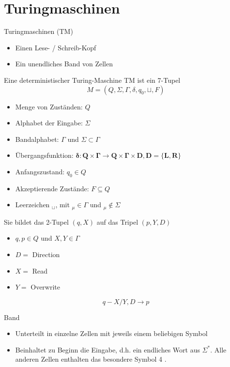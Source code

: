 \graphicspath{{images/}}

\section*{Turingmaschinen}

\begin{theorem}{Turingmaschinen (TM)}
    \begin{itemize}
        \item Einen Lese- / Schreib-Kopf
        \item Ein unendliches Band von Zellen
      \end{itemize}
      
      Eine deterministischer Turing-Maschine TM ist ein 7-Tupel
      $$
      M=\left(Q, \Sigma, \Gamma, \delta, q_{0}, \sqcup , F\right)
      $$
      \begin{itemize}
        \item Menge von Zuständen: $Q$
        \item Alphabet der Eingabe: $\Sigma$
        \item Bandalphabet: $\Gamma$ und $\Sigma \subset \Gamma$
        \item Übergangsfunktion: $\boldsymbol{\delta}: \boldsymbol{Q} \times \boldsymbol{\Gamma} \rightarrow \boldsymbol{Q} \times \boldsymbol{\Gamma} \times \boldsymbol{D}, \boldsymbol{D}=\{\boldsymbol{L}, \boldsymbol{R}\}$
        \item Anfangszustand: $q_{0} \in Q$
        \item Akzeptierende Zustände: $F \subseteq Q$
        \item Leerzeichen ${ }_{\sqcup }$, mit ${ }_{\mu} \in \Gamma$ und ${ }_{\mu} \notin \Sigma$
      \end{itemize}
      Sie bildet das 2-Tupel $(q, X)$ auf das Tripel $(p, Y, D)$

    \begin{itemize}
    \item $q, p \in Q$ und $X, Y \in \Gamma$
    \item $D=$ Direction
    \item $X=$ Read
    \item $Y=$ Overwrite
    \end{itemize}
    $$
    q-X / Y, D \rightarrow p
    $$
\end{theorem}

\begin{definition}{Band}
    \begin{itemize}
        \item Unterteilt in einzelne Zellen mit jeweils einem beliebigen Symbol
        \item Beinhaltet zu Beginn die Eingabe, d.h. ein endliches Wort aus $\Sigma^{*}$. Alle anderen Zellen enthalten das besondere Symbol 4 .
    \end{itemize}
\end{definition}

